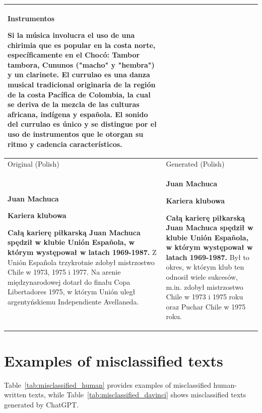 \documentclass{article}
\begin{document}
\begin{table}
\begin{tabular}{p{}p{}}
    \textbf{Instrumentos}

    \textbf{Si la música involucra el uso de una chirimia que es popular en la costa norte, específicamente en el Chocó: Tambor tambora, Cununos ("macho" y "hembra") y un clarinete.} El currulao es una danza musical tradicional originaria de la región de la costa Pacífica de Colombia, la cual se deriva de la mezcla de las culturas africana, indígena y española. El sonido del currulao es único y se distingue por el uso de instrumentos que le otorgan su ritmo y cadencia característicos.
    \\
    \midrule
    Original (Polish) & Generated (Polish) \\
    \midrule
    \textbf{Juan Machuca}

    \textbf{Kariera klubowa}

    \textbf{Całą karierę piłkarską Juan Machuca spędził w klubie Unión Española, w którym występował w latach 1969-1987.} Z Unión Española trzykrotnie zdobył mistrzostwo Chile w 1973, 1975 i 1977. Na arenie międzynarodowej dotarł do finału Copa Libertadores 1975, w którym Unión uległ argentyńskiemu Independiente Avellaneda.
    &
    \textbf{Juan Machuca}

    \textbf{Kariera klubowa}

    \textbf{Całą karierę piłkarską Juan Machuca spędził w klubie Unión Española, w którym występował w latach 1969-1987.} Był to okres, w którym klub ten odnosił wiele sukcesów, m.in. zdobył mistrzostwo Chile w 1973 i 1975 roku oraz Puchar Chile w 1975 roku.
    \\
    \bottomrule    
    \end{tabular}
    \label{tab:examples}
\end{table}

\section{Examples of misclassified texts}\label{sec:misclassified_examples}

Table~\ref{tab:misclassified_human} provides examples of misclassified human-written texts, while Table~\ref{tab:misclassified_davinci} shows misclassified texts generated by ChatGPT.
\end{document}
